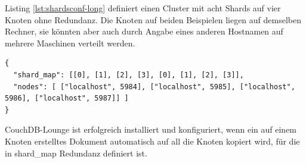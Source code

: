 Listing \ref{lst:shardsconf-long} definiert einen Cluster mit acht Shards auf vier Knoten ohne Redundanz. Die Knoten auf beiden Beispielen liegen auf demselben Rechner, sie könnten aber auch durch Angabe eines anderen Hostnamen auf mehrere Maschinen verteilt werden.

\medskip
\begin{lstlisting}[caption=shards.conf mit vier Knoten ohne Redundanz mit einfachem Oversharding, label=lst:shardsconf-long]
{
  "shard_map": [[0], [1], [2], [3], [0], [1], [2], [3]],
  "nodes": [ ["localhost", 5984], ["localhost", 5985], ["localhost", 5986], ["localhost", 5987]] ]
}
\end{lstlisting}

CouchDB-Lounge ist erfolgreich installiert und konfiguriert, wenn ein auf einem Knoten erstelltes Dokument automatisch auf all die Knoten kopiert wird, für die in {\selectfont shard\_map} Redundanz definiert ist. 

